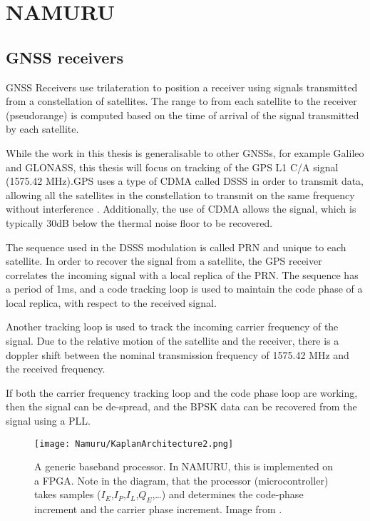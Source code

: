 \chapter{NAMURU}\label{ch:NAMURU}

\section{\ac{GNSS} receivers}

\ac{GNSS} Receivers use trilateration to position a receiver using signals transmitted from a constellation of satellites. The range to from each satellite to the receiver (pseudorange) is computed based on the time of arrival of the signal transmitted by each satellite. 

While the work in this thesis is generalisable to other \ac{GNSS}s, for example Galileo and GLONASS, this thesis will focus on tracking of the GPS L1 \ac{C/A} signal (1575.42 MHz).\ac{GPS} uses a type of \ac{CDMA} called \ac{DSSS} in order to transmit data, allowing all the satellites in the constellation to transmit on the same frequency without interference \cite{Ublox}. Additionally, the use of \ac{CDMA} allows the signal, which is typically 30dB below the thermal noise floor to be recovered\cite{Gleason,Tsui}.

The sequence used in the \ac{DSSS} modulation is called \ac{PRN} and unique to each satellite. In order to recover the signal from a satellite, the GPS receiver correlates the incoming signal with a local replica of the \ac{PRN}. The sequence has a period of 1ms, and a code tracking loop is used to maintain the code phase of a local replica, with respect to the received signal. 

Another tracking loop is used to track the incoming carrier frequency of the signal. Due to the relative motion of the satellite and the receiver, there is a doppler shift between the nominal transmission frequency of 1575.42 MHz and the received frequency. 

If both the carrier frequency tracking loop and the code phase loop are working, then the signal can be de-spread, and the \ac{BPSK} data can be recovered from the signal using a \ac{PLL}.


\begin{figure}[!htb] 
    \centering
    \texttt{[image: Namuru/KaplanArchitecture2.png]} 
    \caption{A generic baseband processor. In \ac{NAMURU}, this is implemented on a \ac{FPGA}. Note in the diagram, that the processor (microcontroller) takes samples ($I_E$,$I_P$,$I_L$,$Q_E$,\ldots) and determines the code-phase increment and the carrier phase increment. Image from \cite{Kaplan}.}
    \label{fig:KaplanArchitecture}
\end{figure}

